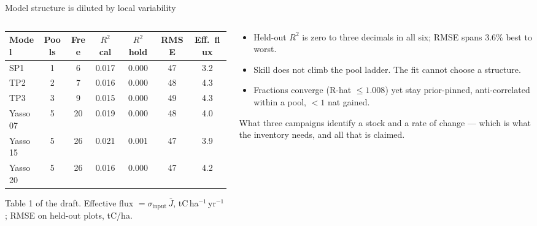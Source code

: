 \documentclass[aspectratio=169,11pt]{beamer}
\begin{document}
\begin{frame}{Model structure is diluted by local variability}
  \footnotesize
  \begin{columns}[T]
    \begin{column}{0.58\textwidth}
      \scriptsize
      \begin{tabular}{lcccccc}
        \toprule
        Model & Pools & Free & $R^2$ cal & $R^2$ hold & RMSE & Eff.\ flux \\
        \midrule
        SP1     & 1 & 6  & 0.017 & 0.000 & 47 & 3.2 \\
        TP2     & 2 & 7  & 0.016 & 0.000 & 48 & 4.3 \\
        TP3     & 3 & 9  & 0.015 & 0.000 & 49 & 4.3 \\
        Yasso07 & 5 & 20 & 0.019 & 0.000 & 48 & 4.0 \\
        Yasso15 & 5 & 26 & 0.021 & 0.001 & 47 & 3.9 \\
        Yasso20 & 5 & 26 & 0.016 & 0.000 & 47 & 4.2 \\
        \bottomrule
      \end{tabular}
      \vspace{0.4em}

      {\tiny Table 1 of the draft. Effective flux $=\sigma_{\mathrm{input}}\,\bar J$, tC\,ha$^{-1}$\,yr$^{-1}$; RMSE on held-out plots, tC/ha.}
    \end{column}
    \begin{column}{0.42\textwidth}
      \begin{itemize}
        \item Held-out $R^2$ is zero to three decimals in all six; RMSE spans 3.6\% best to worst.
        \item Skill does not climb the pool ladder. The fit cannot choose a structure.
        \item Fractions converge (R-hat $\le 1.008$) yet stay prior-pinned, anti-correlated within a pool, $<1$ nat gained.
      \end{itemize}
      \begin{block}{What three campaigns identify}
        a stock and a rate of change --- which is what the inventory needs, and all that is claimed.
      \end{block}
    \end{column}
  \end{columns}
\end{frame}
\end{document}
